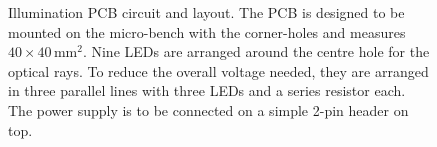 \documentclass[12pt,a4paper]{article}
\begin{document}
\begin{figure}[htbp]
  \centering
   \hfill
  
  \caption{Illumination PCB circuit and layout. 
  The PCB is designed to be mounted on the micro-bench with the corner-holes and measures $40\times40$\,mm$^2$. 
  Nine LEDs are arranged around the centre hole for the optical rays.
  To reduce the overall voltage needed, they are arranged in three parallel lines with three LEDs and a series resistor each.
  The power supply is to be connected on a simple 2-pin header on top.}
  \label{fig:illupcb}
\end{figure}
\end{document}
